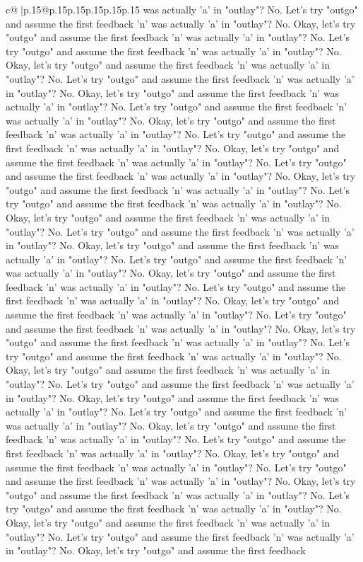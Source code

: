 \documentclass{article}
\begin{document}
{\begin{supertabular}{c@{$\;$}|p{.15\linewidth}@{}p{.15\linewidth}p{.15\linewidth}p{.15\linewidth}p{.15\linewidth}p{.15\linewidth}}
{{{was actually 'a' in "outlay"? No. Let's try "outgo" and assume the first feedback 'n' was actually 'a' in "outlay"? No. Okay, let's try "outgo" and assume the first feedback 'n' was actually 'a' in "outlay"? No. Let's try "outgo" and assume the first feedback 'n' was actually 'a' in "outlay"? No. Okay, let's try "outgo" and assume the first feedback 'n' was actually 'a' in "outlay"? No. Let's try "outgo" and assume the first feedback 'n' was actually 'a' in "outlay"? No. Okay, let's try "outgo" and assume the first feedback 'n' was actually 'a' in "outlay"? No. Let's try "outgo" and assume the first feedback 'n' was actually 'a' in "outlay"? No. Okay, let's try "outgo" and assume the first feedback 'n' was actually 'a' in "outlay"? No. Let's try "outgo" and assume the first feedback 'n' was actually 'a' in "outlay"? No. Okay, let's try "outgo" and assume the first feedback 'n' was actually 'a' in "outlay"? No. Let's try "outgo" and assume the first feedback 'n' was actually 'a' in "outlay"? No. Okay, let's try "outgo" and assume the first feedback 'n' was actually 'a' in "outlay"? No. Let's try "outgo" and assume the first feedback 'n' was actually 'a' in "outlay"? No. Okay, let's try "outgo" and assume the first feedback 'n' was actually 'a' in "outlay"? No. Let's try "outgo" and assume the first feedback 'n' was actually 'a' in "outlay"? No. Okay, let's try "outgo" and assume the first feedback 'n' was actually 'a' in "outlay"? No. Let's try "outgo" and assume the first feedback 'n' was actually 'a' in "outlay"? No. Okay, let's try "outgo" and assume the first feedback 'n' was actually 'a' in "outlay"? No. Let's try "outgo" and assume the first feedback 'n' was actually 'a' in "outlay"? No. Okay, let's try "outgo" and assume the first feedback 'n' was actually 'a' in "outlay"? No. Let's try "outgo" and assume the first feedback 'n' was actually 'a' in "outlay"? No. Okay, let's try "outgo" and assume the first feedback 'n' was actually 'a' in "outlay"? No. Let's try "outgo" and assume the first feedback 'n' was actually 'a' in "outlay"? No. Okay, let's try "outgo" and assume the first feedback 'n' was actually 'a' in "outlay"? No. Let's try "outgo" and assume the first feedback 'n' was actually 'a' in "outlay"? No. Okay, let's try "outgo" and assume the first feedback 'n' was actually 'a' in "outlay"? No. Let's try "outgo" and assume the first feedback 'n' was actually 'a' in "outlay"? No. Okay, let's try "outgo" and assume the first feedback 'n' was actually 'a' in "outlay"? No. Let's try "outgo" and assume the first feedback 'n' was actually 'a' in "outlay"? No. Okay, let's try "outgo" and assume the first feedback 'n' was actually 'a' in "outlay"? No. Let's try "outgo" and assume the first feedback 'n' was actually 'a' in "outlay"? No. Okay, let's try "outgo" and assume the first feedback 'n' was actually 'a' in "outlay"? No. Let's try "outgo" and assume the first feedback 'n' was actually 'a' in "outlay"? No. Okay, let's try "outgo" and assume the first feedback 'n' was actually 'a' in "outlay"? No. Let's try "outgo" and assume the first feedback 'n' was actually 'a' in "outlay"? No. Okay, let's try "outgo" and assume the first feedback }}}
\end{supertabular}}
\end{document}
